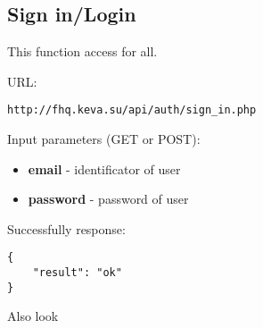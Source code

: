 \subsection{Sign in/Login}
\par

This function access for all.

URL:
\begin{Verbatim}[frame=single]
http://fhq.keva.su/api/auth/sign_in.php
\end{Verbatim}

Input parameters (GET or POST):
\begin{itemize}
  \item \textbf{email} - identificator of user
  \item \textbf{password} - password of user
\end{itemize}

Successfully response:  \\
\begin{Verbatim}[frame=single]
{
    "result": "ok"
}
\end{Verbatim}

Also look ~
